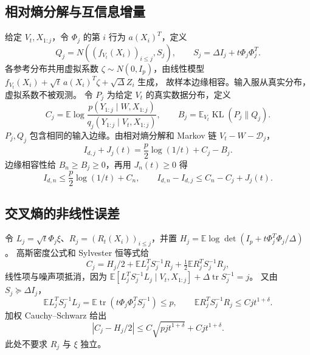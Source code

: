 \documentclass[a4paper]{tufte-handout}
\newcommand{\E}{\mathbb E}
\DeclareMathOperator{\tr}{tr}
\DeclareMathOperator{\KL}{KL}
\begin{document}
\begin{fullwidth}
\subsection{相对熵分解与互信息增量}
给定 $V_t,X_{1:j}$，令 $\Phi_j$ 的第 $i$ 行为 $a(X_i)^T$，定义
\[
 Q_j=N\!\left((f_{V_t}(X_i))_{i\le j},S_j\right),
 \qquad S_j=\Delta I_j+t\Phi_j\Phi_j^T.
\]
各参考分布共用虚拟系数 $\zeta\sim N(0,I_p)$，由线性模型
$f_{V_t}(X_i)+\sqrt t\,a(X_i)^T\zeta+\sqrt\Delta Z_i$ 生成，
故样本边缘相容。输入服从真实分布，虚拟系数不被观测。
令 $P_j$ 为给定 $V_t$ 的真实数据分布，定义
\[
 C_j=\E\log\frac{p(Y_{1:j}\mid W,X_{1:j})}
 {q_j(Y_{1:j}\mid V_t,X_{1:j})},\qquad
 B_j=\E_{V_t}\KL(P_j\|Q_j).
\]
$P_j,Q_j$ 包含相同的输入边缘。由相对熵分解和 Markov 链 $V_t-W-\mathcal D_j$，
\begin{equation}\label{info:reference-identity}
 I_{d,j}+J_j(t)=\frac p2\log(1/t)+C_j-B_j.
\end{equation}
边缘相容性给 $B_n\ge B_j\ge0$，再用 $J_n(t)\ge0$ 得
\begin{equation}\label{alt:block-entropy}
 I_{d,n}\le\frac p2\log(1/t)+C_n,\qquad
 I_{d,n}-I_{d,j}\le C_n-C_j+J_j(t).
\end{equation}

\subsection{交叉熵的非线性误差}
令 $L_j=\sqrt t\Phi_j\xi$、$R_j=(R_t(X_i))_{i\le j}$，并置
$H_j=\E\log\det(I_p+t\Phi_j^T\Phi_j/\Delta)$。
高斯密度公式和 Sylvester 恒等式给
\[
 C_j=H_j/2+\E L_j^TS_j^{-1}R_j+\tfrac12\E R_j^TS_j^{-1}R_j,
\]
线性项与噪声项抵消，因为
$\E[L_j^TS_j^{-1}L_j\mid V_t,X_{1:j}]+\Delta\tr S_j^{-1}=j$。
又由 $S_j\succeq\Delta I_j$，
\[
 \E L_j^TS_j^{-1}L_j=\E\tr(t\Phi_j\Phi_j^TS_j^{-1})\le p,
 \qquad \E R_j^TS_j^{-1}R_j\le Cjt^{1+\delta}.
\]
加权 Cauchy--Schwarz 给出
\begin{equation}\label{alt:cross-entropy}
 |C_j-H_j/2|\le C\sqrt{pj t^{1+\delta}}+Cjt^{1+\delta}.
\end{equation}
此处不要求 $R_j$ 与 $\xi$ 独立。


\end{fullwidth}
\end{document}
